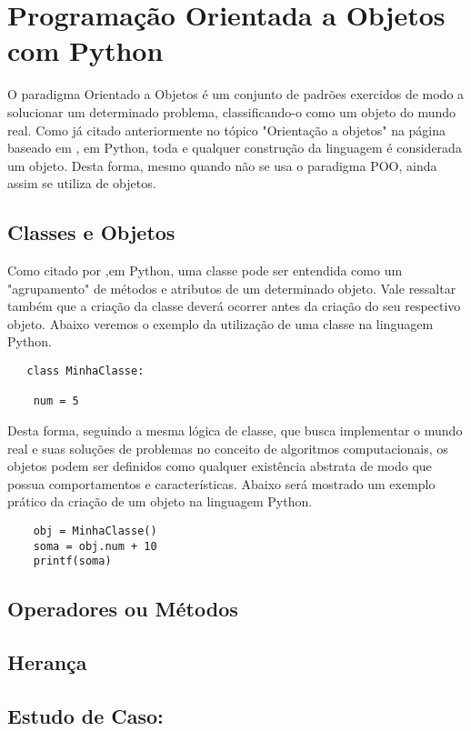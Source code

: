 

\chapter{ Programa\c{c}\~{a}o Orientada a Objetos com Python}
O paradigma Orientado a Objetos é um conjunto de padrões exercidos de modo a solucionar um determinado problema, classificando-o como um objeto do mundo real. Como já citado anteriormente no tópico "Orientação a objetos"  na página \pageref{ling2} baseado em \cite{FBarelli2019} , em Python, toda e qualquer construção da linguagem é considerada um objeto. Desta forma, mesmo quando não se usa o paradigma POO, ainda assim se utiliza de objetos.
    \section{Classes e Objetos}
Como citado por \cite{Perkovic2016},em Python, uma classe pode ser entendida como um "agrupamento" de métodos e atributos de um determinado objeto. Vale ressaltar também que a criação da classe deverá ocorrer antes da criação do seu respectivo objeto. Abaixo veremos o exemplo da utilização de uma classe na linguagem Python.

   \begin{lstlisting}
   class MinhaClasse:
   
    num = 5

    \end{lstlisting}
Desta forma, seguindo a mesma lógica de classe, que busca implementar o mundo real e suas soluções de problemas no conceito de algoritmos computacionais, os objetos podem ser definidos como qualquer existência abstrata de modo que possua comportamentos e características. Abaixo será mostrado um exemplo prático da criação de um objeto na linguagem Python.

   \begin{lstlisting}
	obj = MinhaClasse()
	soma = obj.num + 10
	printf(soma)
\end{lstlisting}
  
    \section{Operadores ou M\'{e}todos}


    \section{Heran\c{c}a}


    \section{Estudo de Caso: }
